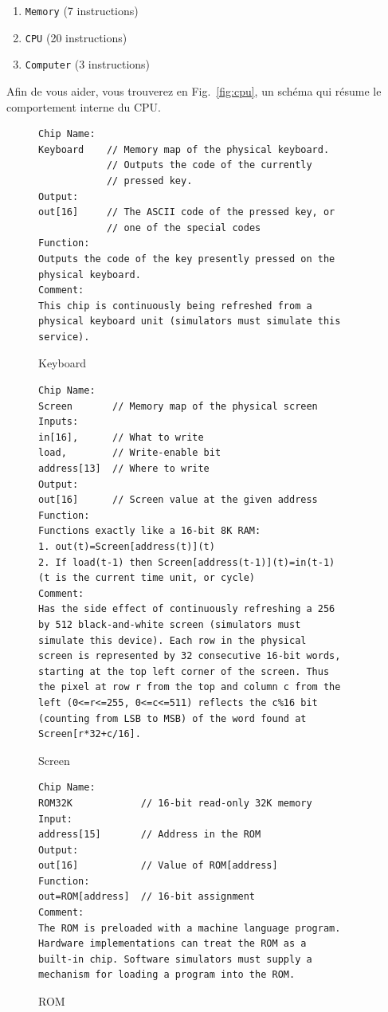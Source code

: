 \documentclass[11pt]{article}
\begin{document}
\begin{enumerate}
\item \texttt{Memory} (7 instructions)
\item \texttt{CPU} (20 instructions)
\item \texttt{Computer} (3 instructions)
\end{enumerate}

Afin de vous aider, vous trouverez en Fig.~\ref{fig:cpu}, un schéma qui résume le comportement interne du CPU.
\begin{figure}
  \centering
\begin{verbatim}
Chip Name:
Keyboard    // Memory map of the physical keyboard.
            // Outputs the code of the currently
            // pressed key.
Output:
out[16]     // The ASCII code of the pressed key, or
            // one of the special codes
Function:
Outputs the code of the key presently pressed on the
physical keyboard.
Comment:
This chip is continuously being refreshed from a
physical keyboard unit (simulators must simulate this
service).
\end{verbatim}

  \caption{Keyboard}
  \label{fig:keyboard}
\end{figure}
\begin{figure}
  \centering
\begin{verbatim}
Chip Name:
Screen       // Memory map of the physical screen
Inputs:
in[16],      // What to write
load,        // Write-enable bit
address[13]  // Where to write
Output:
out[16]      // Screen value at the given address
Function:
Functions exactly like a 16-bit 8K RAM:
1. out(t)=Screen[address(t)](t)
2. If load(t-1) then Screen[address(t-1)](t)=in(t-1)
(t is the current time unit, or cycle)
Comment:
Has the side effect of continuously refreshing a 256
by 512 black-and-white screen (simulators must
simulate this device). Each row in the physical
screen is represented by 32 consecutive 16-bit words,
starting at the top left corner of the screen. Thus
the pixel at row r from the top and column c from the
left (0<=r<=255, 0<=c<=511) reflects the c%16 bit
(counting from LSB to MSB) of the word found at
Screen[r*32+c/16].
\end{verbatim}

  \caption{Screen}
  \label{fig:screen}
\end{figure}
\begin{figure}
  \centering
\begin{verbatim}
Chip Name:
ROM32K            // 16-bit read-only 32K memory
Input:
address[15]       // Address in the ROM
Output:
out[16]           // Value of ROM[address]
Function:
out=ROM[address]  // 16-bit assignment
Comment:
The ROM is preloaded with a machine language program.
Hardware implementations can treat the ROM as a
built-in chip. Software simulators must supply a
mechanism for loading a program into the ROM.
\end{verbatim}
  \caption{ROM}
  \label{fig:rom}
\end{figure}
\end{document}
